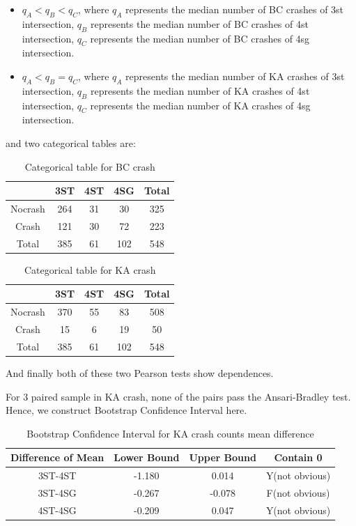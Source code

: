 \documentclass[11pt]{scrartcl} %
\begin{document}
\begin{itemize}
	\item ${q_A} < {q_B} < {q_C}$, where $q_A$ represents the median number of BC crashes of 3st intersection, $q_B$ represents the median number of BC crashes of 4st intersection, $q_C$ represents the median number of BC crashes of 4sg intersection.
	\item ${q_A} < {q_B} = {q_C}$, where $q_A$ represents the median number of KA crashes of 3st intersection, $q_B$ represents the median number of KA crashes of 4st intersection, $q_C$ represents the median number of KA crashes of 4sg intersection.
\end{itemize}

and two categorical tables are:

\begin{table}[H]
\caption{Categorical table for BC crash}
\centering
\begin{tabular}{|c|c|c|c|c|}
\hline
      & 3ST & 4ST & 4SG & Total \\
\hline
Nocrash & 264 & 31  & 30 & 325 \\
\hline
Crash    & 121  & 30  & 72  & 223 \\
\hline
Total    & 385  & 61  & 102  & 548 \\
\hline
\end{tabular}
\end{table}

\begin{table}[H]
\caption{Categorical table for KA crash}
\centering
\begin{tabular}{|c|c|c|c|c|}
\hline
      & 3ST & 4ST & 4SG & Total \\
\hline
Nocrash & 370 & 55  & 83 & 508 \\
\hline
Crash    & 15  & 6  & 19  & 50 \\
\hline
Total    & 385  & 61  & 102  & 548 \\
\hline
\end{tabular}
\end{table}

And finally both of these two Pearson tests show dependences.

For 3 paired sample in KA crash, none of the pairs pass the Ansari-Bradley test. Hence, we construct Bootstrap Confidence Interval here.

\begin{table}[H]
\caption{Bootstrap Confidence Interval for KA crash counts mean difference}
\centering
\begin{tabular}{|c|c|c|c|}
\hline
Difference of Mean  & Lower Bound & Upper Bound & Contain 0 \\
\hline
3ST-4ST & -1.180 & 0.014 & Y(not obvious) \\
\hline
3ST-4SG   & -0.267  & -0.078  & F(not obvious) \\
\hline
4ST-4SG   & -0.209  & 0.047 & Y(not obvious) \\
\hline
\end{tabular}
\end{table}
\end{document}

